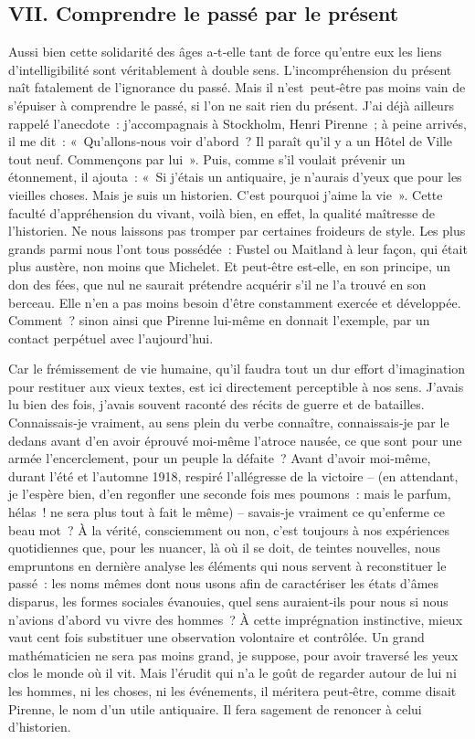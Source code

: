 \documentclass[french,twoside]{book} %
\begin{document}
\subsection[{VII. Comprendre le passé par le présent}]{VII. Comprendre le passé par le présent}
\noindent Aussi bien cette solidarité des âges a‑t‑elle tant de force qu’entre eux les liens d’intelligibilité sont véritablement à double sens. L’incompré­hension du présent naît fatalement de l’ignorance du passé. Mais il n’est peut‑être pas moins vain de s’épuiser à comprendre le passé, si l’on ne sait rien du présent. J’ai déjà ailleurs rappelé l’anecdote : j’accompagnais à Stockholm, Henri Pirenne ; à peine arrivés, il me dit : « Qu’allons‑nous voir d’abord ? Il paraît qu’il y a un Hôtel de Ville tout neuf. Commen­çons par lui ». Puis, comme s’il voulait prévenir un étonnement, il ajouta : « Si j’étais un antiquaire, je n’aurais d’yeux que pour les vieilles choses. Mais je suis un historien. C’est pourquoi j’aime la vie ». Cette faculté d’appréhension du vivant, voilà bien, en effet, la qualité maîtresse de l’historien. Ne nous laissons pas tromper par certaines froideurs de style. Les plus grands parmi nous l’ont tous possédée : Fustel ou Maitland à leur façon, qui était plus austère, non moins que Michelet. Et peut‑être est‑elle, en son principe, un don des fées, que nul ne saurait prétendre acquérir s’il ne l’a trouvé en son berceau. Elle n’en a pas moins besoin d’être  
\label{p14} constamment exercée et développée. Comment ? sinon ainsi que Pirenne lui-même en donnait l’exemple, par un contact perpétuel avec l’aujourd’hui.\par
Car le frémissement de vie humaine, qu’il faudra tout un dur effort d’imagination pour restituer aux vieux textes, est ici directement per­ceptible à nos sens. J’avais lu bien des fois, j’avais souvent raconté des récits de guerre et de batailles. Connaissais‑je vraiment, au sens plein du verbe connaître, connaissais‑je par le dedans avant d’en avoir éprouvé moi-même l’atroce nausée, ce que sont pour une armée l’encerclement, pour un peuple la défaite ? Avant d’avoir moi-même, durant l’été et l’au­tomne 1918, respiré l’allégresse de la victoire – (en attendant, je l’espère bien, d’en regonfler une seconde fois mes poumons : mais le parfum, hélas ! ne sera plus tout à fait le même) – savais‑je vraiment ce qu’enferme ce beau mot ? À la vérité, consciemment ou non, c’est toujours à nos expériences quotidiennes que, pour les nuancer, là où il se doit, de teintes nouvelles, nous empruntons en dernière analyse les éléments qui nous servent à reconstituer le passé : les noms mêmes dont nous usons afin de caractériser les états d’âmes disparus, les formes sociales évanouies, quel sens auraient‑ils pour nous si nous n’avions d’abord vu vivre des hommes ? À cette imprégnation instinctive, mieux vaut cent fois substi­tuer une observation volontaire et contrôlée. Un grand mathématicien ne sera pas moins grand, je suppose, pour avoir traversé les yeux clos le monde où il vit. Mais l’érudit qui n’a le goût de regarder autour de lui ni les hommes, ni les choses, ni les événements, il méritera peut‑être, comme disait Pirenne, le nom d’un utile antiquaire. Il fera sagement de renoncer à celui d’historien.\par
\end{document}

